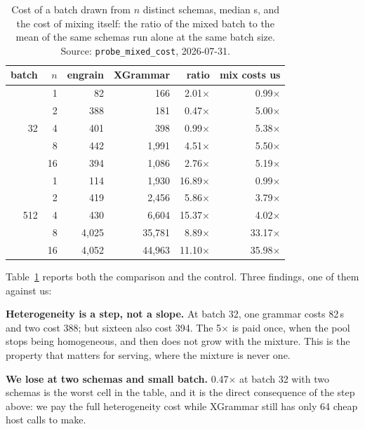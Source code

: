 \documentclass{article}
\begin{document}
\begin{table}[t]
\caption{Cost of a batch drawn from $n$ distinct schemas, median \textmu{}s, and
the cost of mixing itself: the ratio of the mixed batch to the mean of the same
schemas run alone at the same batch size.
Source: \texttt{probe\_mixed\_cost}, 2026-07-31.}
\label{tab:mixed}
\vskip 0.1in
\begin{center}
\begin{small}
\begin{tabular}{rrrrrr}
\toprule
batch & $n$ & engrain & XGrammar & ratio & mix costs us \\
\midrule
\multirow{5}{*}{32}
 & 1  & 82    & 166    & 2.01$\times$ & 0.99$\times$ \\
 & 2  & 388   & 181    & 0.47$\times$ & 5.00$\times$ \\
 & 4  & 401   & 398    & 0.99$\times$ & 5.38$\times$ \\
 & 8  & 442   & 1{,}991 & 4.51$\times$ & 5.50$\times$ \\
 & 16 & 394   & 1{,}086 & 2.76$\times$ & 5.19$\times$ \\
\multirow{5}{*}{512}
 & 1  & 114   & 1{,}930 & 16.89$\times$ & 0.99$\times$ \\
 & 2  & 419   & 2{,}456 & 5.86$\times$ & 3.79$\times$ \\
 & 4  & 430   & 6{,}604 & 15.37$\times$ & 4.02$\times$ \\
 & 8  & 4{,}025 & 35{,}781 & 8.89$\times$ & 33.17$\times$ \\
 & 16 & 4{,}052 & 44{,}963 & 11.10$\times$ & 35.98$\times$ \\
\bottomrule
\end{tabular}
\end{small}
\end{center}
\vskip -0.1in
\end{table}

Table~\ref{tab:mixed} reports both the comparison and the control. Three
findings, one of them against us:

\textbf{Heterogeneity is a step, not a slope.} At batch 32, one grammar costs
82\,\textmu{}s and two cost 388; but sixteen also cost 394. The 5$\times$ is paid
once, when the pool stops being homogeneous, and then does not grow with the
mixture. This is the property that matters for serving, where the mixture is
never one.

\textbf{We lose at two schemas and small batch.} 0.47$\times$ at batch 32 with
two schemas is the worst cell in the table, and it is the direct consequence of
the step above: we pay the full heterogeneity cost while XGrammar still has only
64 cheap host calls to make.
\end{document}

